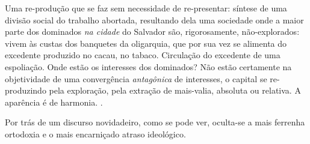 \begin{citacao}
Uma re-produção que se faz sem necessidade de re-presentar: síntese de uma divisão social do trabalho abortada, resultando dela uma sociedade onde a maior parte dos dominados \textit{na cidade} do Salvador são, rigorosamente, não-explorados: vivem às custas dos banquetes da oligarquia, que por sua vez se alimenta do excedente produzido no cacau, no tabaco. Circulação do excedente de uma espoliação. Onde estão os interesses dos dominados? Não estão certamente na objetividade de uma convergência \textit{antagônica} de interesses, o capital se re-produzindo pela exploração, pela extração de mais-valia, absoluta ou relativa. A aparência é de harmonia.
\cite[p.~37-38]{OLIVEIRA1987}.
\end{citacao}

Por trás de um discurso novidadeiro, como se pode ver, oculta-se a mais ferrenha ortodoxia e o mais encarniçado atraso ideológico.